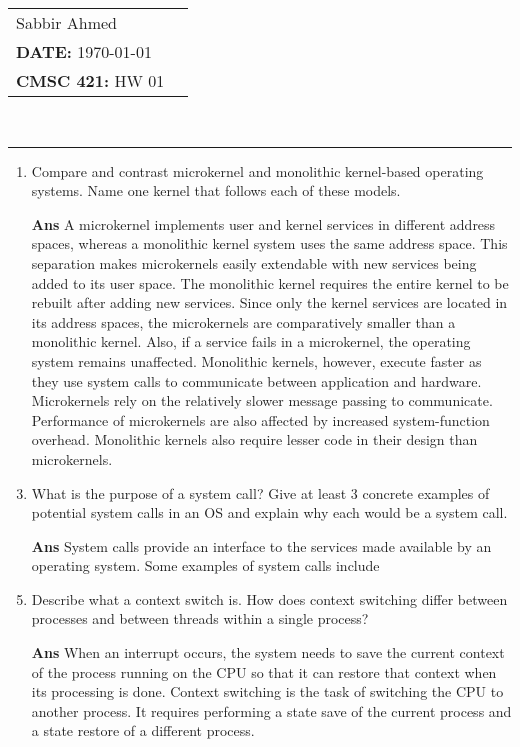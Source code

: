 \documentclass[paper=usletter, fontsize=12pt]{extarticle}
\newcommand{\documentinfo}[5]{
    \begin{centering}
        \parbox{2in}{
        \begin{spacing}{1}
            \begin{flushleft}
                \begin{tabular}{l l}
                    #1 \\
                    #2 \\
                    #3 \\
                \end{tabular}\\
                \rule{\textwidth}{1pt}
            \end{flushleft}
        \end{spacing}
        }
    \end{centering}
}
\begin{document}
    \documentinfo{Sabbir Ahmed}{\textbf{DATE:} \today}{\textbf{CMSC 421:} HW 01}
    \vspace{-0.2in}

    \begin{enumerate}[label=\textbf{\arabic*}]

        \item Compare and contrast microkernel and monolithic kernel-based
        operating systems. Name one kernel that follows each of these models.
        \item[\textbf{Ans}]
        A microkernel implements user and kernel services in different address
        spaces, whereas a monolithic kernel system uses the same address space.
        This separation makes microkernels easily extendable with new services
        being added to its user space. The monolithic kernel requires the
        entire kernel to be rebuilt after adding new services. Since only the
        kernel services are located in its address spaces, the microkernels are
        comparatively smaller than a monolithic kernel. Also, if a service
        fails in a microkernel, the operating system remains unaffected.
        Monolithic kernels, however, execute faster as they use system calls to
        communicate between application and hardware. Microkernels rely on the
        relatively slower message passing to communicate. Performance of
        microkernels are also affected by increased system-function overhead.
        Monolithic kernels also require lesser code in their design than
        microkernels.
        \vspace{0.2in}

        \item What is the purpose of a system call? Give at least 3 concrete
        examples of potential system calls in an OS and explain why each would
        be a system call.
        \item[\textbf{Ans}]
        System calls provide an interface to the services made available by an
        operating system. Some examples of system calls include 
        \vspace{0.2in}

        \item Describe what a context switch is. How does context switching
        differ between processes and between threads within a single process?
        \item[\textbf{Ans}]
        When an interrupt occurs, the system needs to save the current context
        of the process running on the CPU so that it can restore that context
        when its processing is done. Context switching is the task of switching
        the CPU to another process. It requires performing a state save of the
        current process and a state restore of a different process.
        \vspace{0.2in}


\end{enumerate}
\end{document}
